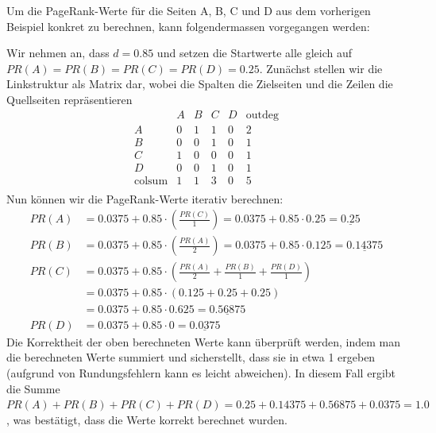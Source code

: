 \begin{myexample}
    Um die PageRank-Werte für die Seiten A, B, C und D aus dem vorherigen Beispiel konkret zu berechnen, kann folgendermassen vorgegangen werden:


    Wir nehmen an, dass $d=0.85$ und setzen die Startwerte alle gleich auf $PR(A)=PR(B)=PR(C)=PR(D)=0.25$. Zunächst stellen wir die Linkstruktur als Matrix dar, wobei die Spalten die Zielseiten und die Zeilen die Quellseiten repräsentieren
    \[
        \begin{array}{c|cccc|c}
                          & A & B & C & D & \text{outdeg} \\
            \hline
            A             & 0 & 1 & 1 & 0 & 2             \\
            B             & 0 & 0 & 1 & 0 & 1             \\
            C             & 1 & 0 & 0 & 0 & 1             \\
            D             & 0 & 0 & 1 & 0 & 1             \\
            \hline
            \text{colsum} & 1 & 1 & 3 & 0 & 5             \\
        \end{array}
    \]
    Nun können wir die PageRank-Werte iterativ berechnen:
    \[
        \begin{aligned}
            PR(A) & = 0.0375 + 0.85 \cdot \left(\frac{PR(C)}{1}\right) = 0.0375 + 0.85 \cdot 0.25 = \underline{0.25}     \\
            PR(B) & = 0.0375 + 0.85 \cdot \left(\frac{PR(A)}{2}\right) = 0.0375 + 0.85 \cdot 0.125 = \underline{0.14375} \\
            PR(C) & = 0.0375 + 0.85 \cdot \left(\frac{PR(A)}{2} + \frac{PR(B)}{1} + \frac{PR(D)}{1}\right)               \\
                  & =0.0375 + 0.85 \cdot (0.125 + 0.25 + 0.25)                                                           \\
                  & =0.0375 + 0.85 \cdot 0.625 = \underline{0.56875}                                                     \\
            PR(D) & = 0.0375 + 0.85 \cdot 0 = \underline{0.0375}
        \end{aligned}
    \]
    Die Korrektheit der oben berechneten Werte kann überprüft werden, indem man die berechneten Werte summiert und sicherstellt, dass sie in etwa 1 ergeben (aufgrund von Rundungsfehlern kann es leicht abweichen). In diesem Fall ergibt die Summe $PR(A) + PR(B) + PR(C) + PR(D) = 0.25 + 0.14375 + 0.56875 + 0.0375 = 1.0$, was bestätigt, dass die Werte korrekt berechnet wurden.


\end{myexample}
